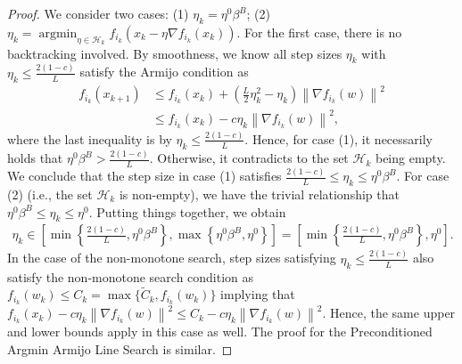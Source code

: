 \documentclass[10pt]{article} %
\newtheorem{theorem}{Theorem}
\newcommand{\EE}{\mathbb{E}}
\newcommand{\norm}[1]{\left \lVert #1 \right \rVert}
\DeclareMathOperator{\argmin}{argmin}
\begin{document}
\begin{proof}
    We consider two cases: (1) $\eta_k = \eta^{0} \beta^B$; (2) $\eta_k = \argmin_{\eta \in \mathcal{H}_k} f_{i_k}(x_k - \eta \nabla f_{i_k}(x_k))$. For the first case, there is no backtracking involved. By  smoothness, we know all step sizes $\eta_k$ with $\eta_k \leq \frac{2(1-c)}{L}$ satisfy the Armijo condition as
    \begin{align*}
        f_{i_k}(x_{k+1}) &\leq f_{i_k}(x_k) + (\frac{L}{2} \eta_k^2 - \eta_k) \norm{\nabla f_{i_k}(w)}^2 \\ 
        &\leq f_{i_k}(x_k) - c \eta_k \norm{\nabla f_{i_k}(w)}^2,
    \end{align*}
    where the last inequality is by $\eta_k \leq \frac{2(1-c)}{L}$. Hence, for case (1), it necessarily holds that $\eta^0 \beta^B > \frac{2(1-c)}{L}$. Otherwise, it contradicts to the set $\mathcal{H}_k$ being empty. We conclude that the step size in case (1) satisfies $\frac{2(1-c)}{L} \leq \eta_k \leq \eta^0 \beta^B$. For case (2) (i.e., the set $\mathcal{H}_k$ is non-empty), we have the trivial relationship that $\eta^0\beta^B \leq \eta_k \leq \eta^0$. Putting things together, we obtain
    \begin{align*}
        \eta_k \in \left[ \min\left\{ \frac{2(1-c)}{L}, \eta^0 \beta^B\right\}, \max\left\{\eta^0 \beta^B, \eta^0 \right\}\right] = \left[ \min\left\{ \frac{2(1-c)}{L}, \eta^0 \beta^B\right\},  \eta^0 \right]. 
    \end{align*}
    In the case of the non-monotone search, step sizes satisfying $\eta_k \leq \frac{2(1-c)}{L}$ also satisfy the non-monotone search condition as $f_{i_k}(w_k) \leq C_k = \max \{ \tilde{C}_k, f_{i_k}(w_k)\}$ implying that $f_{i_k}(x_k) - c \eta_k \norm{\nabla f_{i_k}(w)}^2 \leq C_k - c \eta_k \norm{\nabla f_{i_k}(w)}^2$. Hence, the same upper and lower bounds apply in this case as well. The proof for the Preconditioned Argmin Armijo Line Search is similar. 
\end{proof}

\end{document}
